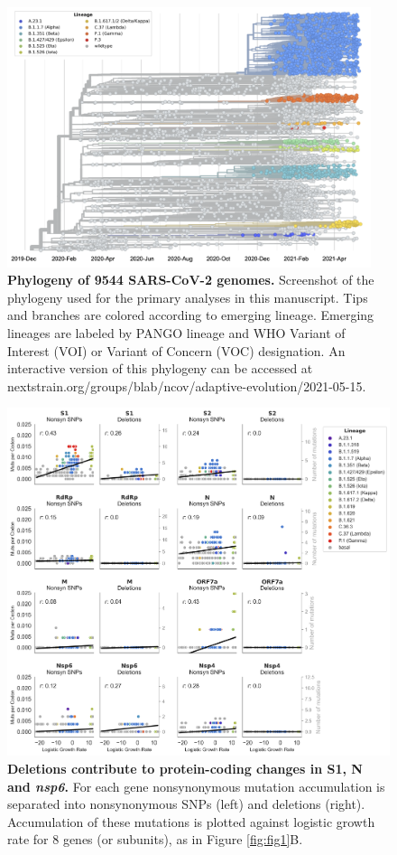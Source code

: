 \documentclass[12pt, letterpaper]{article}
\begin{document}
\begin{figure}[h!]
	\centerline{\includegraphics[width=0.95\textwidth]{fig1_supp1.png}}
	\caption{\textbf{Phylogeny of 9544 SARS-CoV-2 genomes.}
	Screenshot of the phylogeny used for the primary analyses in this manuscript. Tips and branches are colored according to emerging lineage. Emerging lineages are labeled by PANGO lineage and WHO Variant of Interest (VOI) or Variant of Concern (VOC) designation. An interactive version of this phylogeny can be accessed at nextstrain.org/groups/blab/ncov/adaptive-evolution/2021-05-15.
	}
	\label{fig:fig1_supp1}
\end{figure}

\begin{figure}[h!]
	\centerline{\includegraphics[scale=0.5]{fig1_supp2.png}}
	\caption{\textbf{Deletions contribute to protein-coding changes in S1, N and \emph{nsp6}.}
	For each gene nonsynonymous mutation accumulation is separated into nonsynonymous SNPs (left) and deletions (right). Accumulation of these mutations is plotted against logistic growth rate for 8 genes (or subunits), as in Figure \ref{fig:fig1}B.
	}
	\label{fig:fig1_supp2}
\end{figure}
\end{document}
